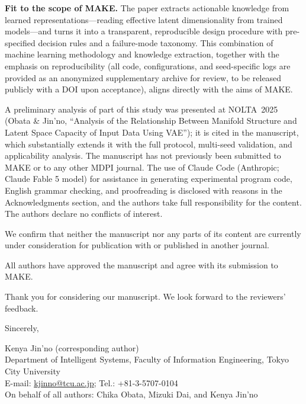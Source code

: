 \documentclass[10pt,a4paper]{article}
\begin{document}
\textbf{Fit to the scope of MAKE.}
The paper extracts actionable knowledge from learned
representations---reading effective latent dimensionality from trained
models---and turns it into a transparent, reproducible design procedure
with pre-specified decision rules and a failure-mode taxonomy. This
combination of machine learning methodology and knowledge extraction,
together with the emphasis on reproducibility (all code, configurations,
and seed-specific logs are provided as an anonymized supplementary archive
for review, to be released publicly with a DOI upon acceptance), aligns
directly with the aims of MAKE.

A preliminary analysis of part of this study was presented at NOLTA~2025
(Obata \& Jin'no, ``Analysis of the Relationship Between Manifold Structure
and Latent Space Capacity of Input Data Using VAE''); it is cited in the
manuscript, which substantially extends it with the full protocol,
multi-seed validation, and applicability analysis. The manuscript has not
previously been submitted to MAKE or to any other MDPI journal. The use of
Claude Code (Anthropic; Claude Fable 5 model) for assistance in generating
experimental program code, English grammar checking, and proofreading is
disclosed with reasons in the
Acknowledgments section, and the authors take full responsibility for the
content. The authors declare no conflicts of interest.

We confirm that neither the manuscript nor any parts of its content are
currently under consideration for publication with or published in another
journal.

All authors have approved the manuscript and agree with its submission to
MAKE.

Thank you for considering our manuscript. We look forward to the
reviewers' feedback.

\vspace{0.8em}

\noindent
Sincerely,

\vspace{0.5em}

\noindent
Kenya Jin'no (corresponding author)\\
Department of Intelligent Systems, Faculty of Information Engineering,
Tokyo City University\\
E-mail: \href{mailto:kjinno@tcu.ac.jp}{kjinno@tcu.ac.jp};
Tel.: +81-3-5707-0104\\
On behalf of all authors: Chika Obata, Mizuki Dai, and Kenya Jin'no
\end{document}
